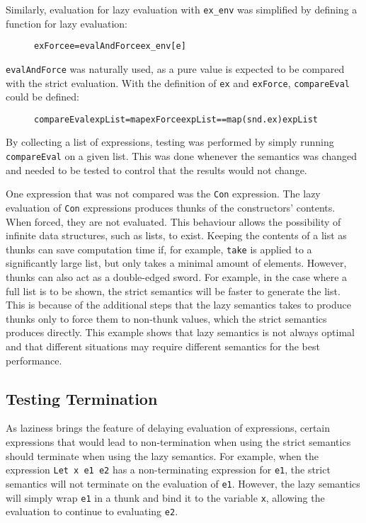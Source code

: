 \noindent Similarly, evaluation for lazy evaluation with \texttt{ex\_env} was
simplified by defining a function for lazy evaluation:

\begin{figure}[H]
\begin{alltt}
  exForce e = evalAndForce ex_env [e]
\end{alltt}
\end{figure}

\noindent \texttt{evalAndForce} was naturally used, as a pure value is expected
to be compared with the strict evaluation. With the definition of \texttt{ex}
and \texttt{exForce}, \texttt{compareEval} could be defined:

\begin{figure}[H]
\begin{alltt}
  compareEval expList = map exForce expList == map (snd . ex) expList
\end{alltt}
\end{figure}

By collecting a list of expressions, testing was performed by simply running
\texttt{compareEval} on a given list. This was done whenever the semantics was
changed and needed to be tested to control that the results would not change.

One expression that was not compared was the \texttt{Con} expression. The lazy
evaluation of \texttt{Con} expressions produces thunks of the constructors'
contents. When forced, they are not evaluated. This behaviour allows the
possibility of infinite data structures, such as lists, to exist.
Keeping the contents of a list as thunks can save computation time if,
for example, \texttt{take} is applied to a significantly large list, but only
takes a minimal amount of elements. However, thunks can also
act as a double-edged sword. For example, in the case where a full list is to be
shown, the strict semantics will be faster to generate the list. This is because
of the additional steps that the lazy semantics takes to produce thunks only to
force them to non-thunk values, which the strict semantics produces directly.
This example shows that lazy semantics is not always optimal and that different
situations may require different semantics for the best performance.

\subsection{Testing Termination}
As laziness brings the feature of delaying evaluation of expressions, certain
expressions that would lead to non-termination when using the strict semantics
should terminate when using the lazy semantics. For example, when the expression
\texttt{Let x e1 e2} has a non-terminating expression for \texttt{e1}, the
strict semantics will not terminate on the evaluation of \texttt{e1}. However,
the lazy semantics will simply wrap \texttt{e1} in a thunk and bind it to the
variable \texttt{x}, allowing the evaluation to continue to evaluating
\texttt{e2}.

